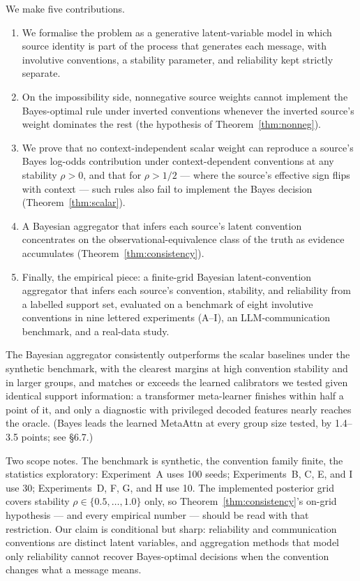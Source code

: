 We make five contributions.
\begin{enumerate}
\item We formalise the problem as a generative latent-variable model
in which source identity is part of the process that generates each
message, with
involutive conventions, a stability parameter, and reliability kept
strictly separate.
\item On the impossibility side, nonnegative source weights cannot
implement the Bayes-optimal rule under inverted conventions whenever the
inverted source's weight dominates the rest (the hypothesis of
Theorem~\ref{thm:nonneg}).
\item We prove that no context-independent scalar weight can
reproduce a source's Bayes log-odds contribution under
context-dependent conventions at any stability $\rho > 0$, and that
for $\rho > 1/2$ --- where the source's effective sign flips with
context --- such rules also fail to implement the Bayes decision
(Theorem~\ref{thm:scalar}).
\item A Bayesian aggregator that infers each source's latent convention
concentrates on the observational-equivalence class of the truth as
evidence accumulates (Theorem~\ref{thm:consistency}).
\item Finally, the empirical piece: a finite-grid Bayesian
latent-convention aggregator that infers each source's convention,
stability, and reliability from a labelled support set, evaluated on a
benchmark of eight involutive conventions in nine lettered experiments
(A--I), an LLM-communication benchmark, and a real-data study.
\end{enumerate}
The Bayesian aggregator consistently outperforms the scalar baselines
under the synthetic benchmark, with the clearest margins at high
convention stability and in larger groups, and matches or exceeds the
learned calibrators we tested given identical support information: a
transformer meta-learner finishes within half a point of it, and only a
diagnostic with privileged decoded features nearly reaches the oracle.
(Bayes leads the learned MetaAttn at every group size tested, by
1.4--3.5 points; see \S6.7.)

Two scope notes. The benchmark is synthetic, the
convention family finite, the statistics exploratory: Experiment~A uses
100 seeds; Experiments~B, C, E, and I use 30; Experiments~D, F, G, and H
use 10. The implemented posterior grid covers stability
$\rho \in \{0.5, \ldots, 1.0\}$ only, so
Theorem~\ref{thm:consistency}'s on-grid hypothesis --- and every
empirical number --- should be read with that restriction. Our
claim is conditional but sharp: reliability and communication conventions
are distinct latent variables, and aggregation methods that model only
reliability cannot recover Bayes-optimal decisions when the convention
changes what a message means.
